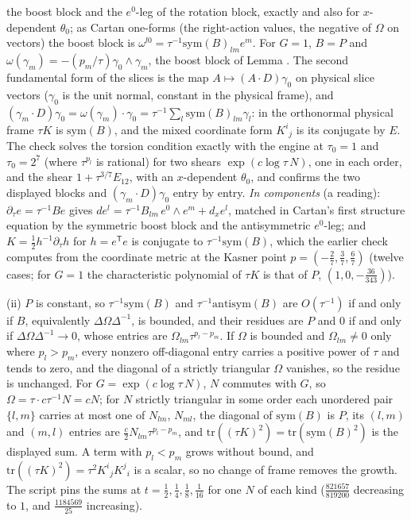 the boost block and the $e^{0}$-leg of the rotation block, exactly and also for $x$-dependent $\theta_{0}$; as Cartan one-forms (the right-action values, the negative of $\Omega$ on vectors) the boost block is $\omega^{l0} = \tau^{-1}\mathrm{sym}(B)_{lm}e^{m}$. For $G = 1$, $B = P$ and $\omega(\gamma_{m}) = -(p_{m}/\tau)\gamma_{0} \wedge \gamma_{m}$, the boost block of Lemma . The second fundamental form of the slices is the map $A \mapsto (A \cdot D)\gamma_{0}$ on physical slice vectors ($\gamma_{0}$ is the unit normal, constant in the physical frame), and $(\gamma_{m} \cdot D)\gamma_{0} = \omega(\gamma_{m}) \cdot \gamma_{0} = \tau^{-1}\sum_{l}\mathrm{sym}(B)_{lm}\gamma_{l}$: in the orthonormal physical frame $\tau K$ is $\mathrm{sym}(B)$, and the mixed coordinate form $K^{i}{}_{j}$ is its conjugate by $E$. The check solves the torsion condition exactly with the engine at $\tau_{0} = 1$ and $\tau_{0} = 2^{7}$ (where $\tau^{p_{l}}$ is rational) for two shears $\exp(c\log\tau\,N)$, one in each order, and the shear $1 + \tau^{3/7}E_{12}$, with an $x$-dependent $\theta_{0}$, and confirms the two displayed blocks and $(\gamma_{m} \cdot D)\gamma_{0}$ entry by entry. \emph{In components} (a reading): $\partial_{\tau}e = \tau^{-1}Be$ gives $de^{l} = \tau^{-1}B_{lm}\,e^{0} \wedge e^{m} + d_{x}e^{l}$, matched in Cartan's first structure equation by the symmetric boost block and the antisymmetric $e^{0}$-leg; and $K = \tfrac12 h^{-1}\partial_{\tau}h$ for $h = e^{\mathsf T}e$ is conjugate to $\tau^{-1}\mathrm{sym}(B)$, which the earlier check computes from the coordinate metric at the Kasner point $p = (-\tfrac27, \tfrac37, \tfrac67)$ (twelve cases; for $G = 1$ the characteristic polynomial of $\tau K$ is that of $P$, $(1, 0, -\tfrac{36}{343})$).

(ii) $P$ is constant, so $\tau^{-1}\mathrm{sym}(B)$ and $\tau^{-1}\mathrm{antisym}(B)$ are $O(\tau^{-1})$ if and only if $B$, equivalently $\Delta\Omega\Delta^{-1}$, is bounded, and their residues are $P$ and $0$ if and only if $\Delta\Omega\Delta^{-1} \to 0$, whose entries are $\Omega_{lm}\tau^{p_{l} - p_{m}}$. If $\Omega$ is bounded and $\Omega_{lm} \neq 0$ only where $p_{l} > p_{m}$, every nonzero off-diagonal entry carries a positive power of $\tau$ and tends to zero, and the diagonal of a strictly triangular $\Omega$ vanishes, so the residue is unchanged. For $G = \exp(c\log\tau\,N)$, $N$ commutes with $G$, so $\Omega = \tau\cdot c\tau^{-1}N = cN$; for $N$ strictly triangular in some order each unordered pair $\{l, m\}$ carries at most one of $N_{lm}$, $N_{ml}$, the diagonal of $\mathrm{sym}(B)$ is $P$, its $(l,m)$ and $(m,l)$ entries are $\tfrac{c}{2}N_{lm}\tau^{p_{l} - p_{m}}$, and $\mathrm{tr}((\tau K)^{2}) = \mathrm{tr}(\mathrm{sym}(B)^{2})$ is the displayed sum. A term with $p_{l} < p_{m}$ grows without bound, and $\mathrm{tr}((\tau K)^{2}) = \tau^{2}K^{i}{}_{j}K^{j}{}_{i}$ is a scalar, so no change of frame removes the growth. The script pins the sums at $t = \tfrac12, \tfrac14, \tfrac18, \tfrac1{16}$ for one $N$ of each kind ($\tfrac{821657}{819200}$ decreasing to $1$, and $\tfrac{1184569}{25}$ increasing).

